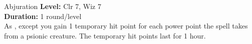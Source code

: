 {Abjuration}
{
	\textbf{Level:} Clr 7, Wiz 7\\
	\textbf{Duration:} 1 round/level\\
}
{
	As , except you gain 1 temporary hit point for each power point the spell takes from a psionic creature. The temporary hit points last for 1 hour.
}